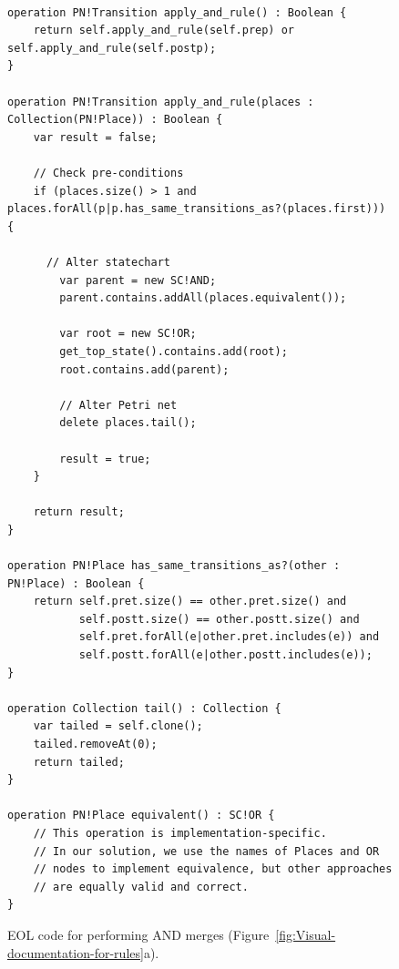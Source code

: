 \documentclass[submission,copyright,creativecommons]{eptcs}
\begin{document}
\begin{figure}
{\tiny {}

\tt
\begin{lstlisting}
operation PN!Transition apply_and_rule() : Boolean {
	return self.apply_and_rule(self.prep) or self.apply_and_rule(self.postp);
}

operation PN!Transition apply_and_rule(places : Collection(PN!Place)) : Boolean {
	var result = false;
	
	// Check pre-conditions
	if (places.size() > 1 and places.forAll(p|p.has_same_transitions_as?(places.first))) {
	  
	  // Alter statechart
		var parent = new SC!AND;
		parent.contains.addAll(places.equivalent());
		
		var root = new SC!OR;
		get_top_state().contains.add(root);		
		root.contains.add(parent);
		
		// Alter Petri net
		delete places.tail();
		
		result = true;
	}
	
	return result;
}

operation PN!Place has_same_transitions_as?(other : PN!Place) : Boolean {
	return self.pret.size() == other.pret.size() and
	       self.postt.size() == other.postt.size() and
	       self.pret.forAll(e|other.pret.includes(e)) and
	       self.postt.forAll(e|other.postt.includes(e));
}

operation Collection tail() : Collection {
	var tailed = self.clone();
	tailed.removeAt(0);
	return tailed;
}

operation PN!Place equivalent() : SC!OR {
	// This operation is implementation-specific.
	// In our solution, we use the names of Places and OR
	// nodes to implement equivalence, but other approaches
	// are equally valid and correct.
}
\end{lstlisting}
\rm
}{\tiny \par}

\caption{\label{fig:eol-merge-and}EOL code for performing AND merges (Figure~\ref{fig:Visual-documentation-for-rules}a).}

\end{figure}
\end{document}
